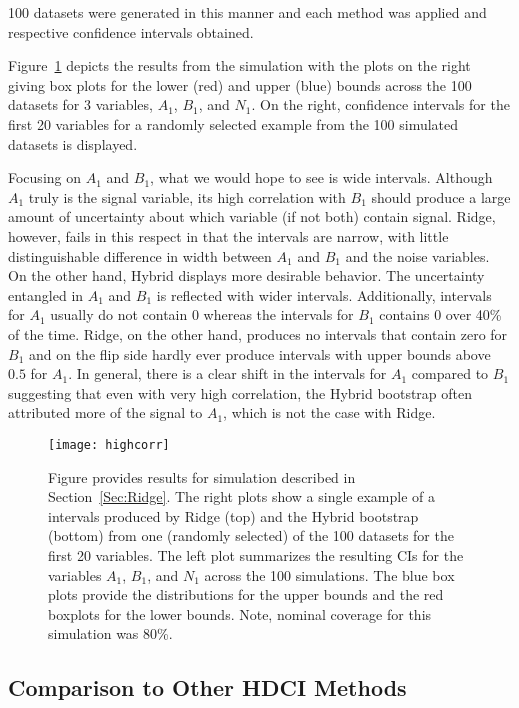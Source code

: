100 datasets were generated in this manner and each method was applied and respective confidence intervals obtained.

Figure~\ref{Fig:highcorr} depicts the results from the simulation with the plots on the right giving box plots for the lower (red) and upper (blue) bounds across the 100 datasets for 3 variables, $A_1$, $B_1$, and $N_1$. On the right, confidence intervals for the first 20 variables for a randomly selected example from the 100 simulated datasets is displayed.

Focusing on $A_1$ and $B_1$, what we would hope to see is wide intervals. Although $A_1$ truly is the signal variable, its high correlation with $B_1$ should produce a large amount of uncertainty about which variable (if not both) contain signal. Ridge, however, fails in this respect in that the intervals are narrow, with little distinguishable difference in width between $A_1$ and $B_1$ and the noise variables. On the other hand, Hybrid displays more desirable behavior. The uncertainty entangled in $A_1$ and $B_1$ is reflected with wider intervals. Additionally, intervals for $A_1$ usually do not contain 0 whereas the intervals for $B_1$ contains 0 over 40\% of the time. Ridge, on the other hand, produces no intervals that contain zero for $B_1$ and on the flip side hardly ever produce intervals with upper bounds above $0.5$ for $A_1$. In general, there is a clear shift in the intervals for $A_1$ compared to $B_1$ suggesting that even with very high correlation, the Hybrid bootstrap often attributed more of the signal to $A_1$, which is not the case with Ridge.

\begin{figure}[hbtp]
  \begin{center}
  \texttt{[image: highcorr]}
  \caption{\label{Fig:highcorr} Figure provides results for simulation described in Section~\ref{Sec:Ridge}. The right plots show a single example of a intervals produced by Ridge (top) and the Hybrid bootstrap (bottom) from one (randomly selected) of the 100 datasets for the first 20 variables. The left plot summarizes the resulting CIs for the variables $A_1$, $B_1$, and $N_1$ across the 100 simulations. The blue box plots provide the distributions for the upper bounds and the red boxplots for the lower bounds. Note, nominal coverage for this simulation was 80\%.}
  \end{center}
\end{figure}

\subsection{Comparison to Other HDCI Methods}\label{Sec:Comparison}

